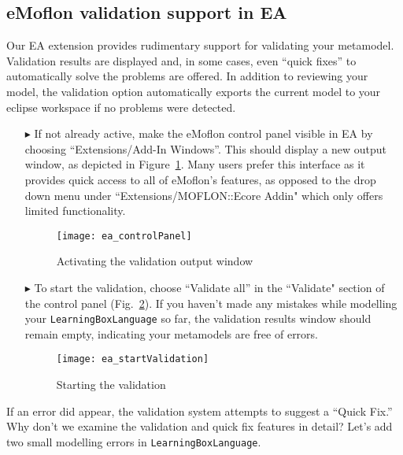 \newpage
\visHeader
\hypertarget{validation vis}{} 
\subsection{eMoflon validation support in EA}

Our EA extension provides rudimentary support for validating your metamodel. Validation results are displayed and, in some cases, even ``quick fixes'' to
automatically solve the problems are offered. In addition to reviewing your model, the validation option automatically exports the current model to your eclipse
workspace if no problems were detected.

\begin{enumerate}
\item[$\blacktriangleright$] If not already active, make the eMoflon control panel visible in EA by choosing ``Extensions/\-Add-In Windows''. This should
display a new output window, as depicted in Figure~\ref{ea:validation_output}.
Many users prefer this interface as it provides quick access to all of eMoflon's features, as opposed to the drop down menu under ``Extensions/MOFLON::Ecore Addin" which only offers limited functionality.

\begin{figure}[htbp]
	\centering
  \texttt{[image: ea\_controlPanel]}
	\caption{Activating the validation output window}
	\label{ea:validation_output}
\end{figure}
\FloatBarrier

\clearpage
\item[$\blacktriangleright$] To start the validation, choose ``Validate all'' in the ``Validate" section of the control panel
(Fig.~\ref{ea:validation_menu}). If you haven't made any mistakes while modelling your \texttt{LearningBoxLanguage} so far, the validation results window
should remain empty, indicating your metamodels are free of errors.

\begin{figure}[htbp]
	\centering
  \texttt{[image: ea\_startValidation]}
	\caption{Starting the validation}
	\label{ea:validation_menu}
\end{figure}
\FloatBarrier
\end{enumerate}

If an error did appear, the validation system attempts to suggest a ``Quick Fix.'' Why don't we examine the validation and quick fix features in detail? Let's
add two small modelling errors in \texttt{LearningBoxLanguage}.

